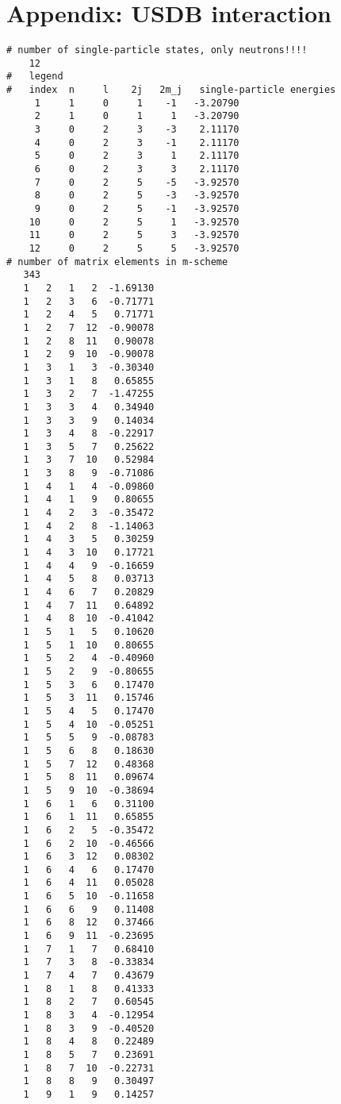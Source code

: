 \documentclass[prc]{revtex4}
\begin{document}
\section*{Appendix: USDB interaction}
\begin{verbatim}
# number of single-particle states, only neutrons!!!!
    12
#   legend
#   index  n     l    2j   2m_j   single-particle energies
     1     1     0     1    -1   -3.20790
     2     1     0     1     1   -3.20790
     3     0     2     3    -3    2.11170
     4     0     2     3    -1    2.11170
     5     0     2     3     1    2.11170
     6     0     2     3     3    2.11170
     7     0     2     5    -5   -3.92570
     8     0     2     5    -3   -3.92570
     9     0     2     5    -1   -3.92570
    10     0     2     5     1   -3.92570
    11     0     2     5     3   -3.92570
    12     0     2     5     5   -3.92570
# number of matrix elements in m-scheme
   343
   1   2   1   2  -1.69130
   1   2   3   6  -0.71771
   1   2   4   5   0.71771
   1   2   7  12  -0.90078
   1   2   8  11   0.90078
   1   2   9  10  -0.90078
   1   3   1   3  -0.30340
   1   3   1   8   0.65855
   1   3   2   7  -1.47255
   1   3   3   4   0.34940
   1   3   3   9   0.14034
   1   3   4   8  -0.22917
   1   3   5   7   0.25622
   1   3   7  10   0.52984
   1   3   8   9  -0.71086
   1   4   1   4  -0.09860
   1   4   1   9   0.80655
   1   4   2   3  -0.35472
   1   4   2   8  -1.14063
   1   4   3   5   0.30259
   1   4   3  10   0.17721
   1   4   4   9  -0.16659
   1   4   5   8   0.03713
   1   4   6   7   0.20829
   1   4   7  11   0.64892
   1   4   8  10  -0.41042
   1   5   1   5   0.10620
   1   5   1  10   0.80655
   1   5   2   4  -0.40960
   1   5   2   9  -0.80655
   1   5   3   6   0.17470
   1   5   3  11   0.15746
   1   5   4   5   0.17470
   1   5   4  10  -0.05251
   1   5   5   9  -0.08783
   1   5   6   8   0.18630
   1   5   7  12   0.48368
   1   5   8  11   0.09674
   1   5   9  10  -0.38694
   1   6   1   6   0.31100
   1   6   1  11   0.65855
   1   6   2   5  -0.35472
   1   6   2  10  -0.46566
   1   6   3  12   0.08302
   1   6   4   6   0.17470
   1   6   4  11   0.05028
   1   6   5  10  -0.11658
   1   6   6   9   0.11408
   1   6   8  12   0.37466
   1   6   9  11  -0.23695
   1   7   1   7   0.68410
   1   7   3   8  -0.33834
   1   7   4   7   0.43679
   1   8   1   8   0.41333
   1   8   2   7   0.60545
   1   8   3   4  -0.12954
   1   8   3   9  -0.40520
   1   8   4   8   0.22489
   1   8   5   7   0.23691
   1   8   7  10  -0.22731
   1   8   8   9   0.30497
   1   9   1   9   0.14257

\end{verbatim}
\end{document}
